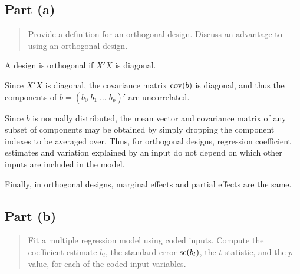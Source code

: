 \documentclass[
]{article}
\begin{document}
\hypertarget{part-a-1}{%
\subsection{Part (a)}\label{part-a-1}}

\begin{quote}
Provide a definition for an orthogonal design. Discuss an advantage to
using an orthogonal design.
\end{quote}

A design is orthogonal if \(X'X\) is diagonal.

Since \(X'X\) is diagonal, the covariance matrix \(\operatorname{cov}(b)\) is
diagonal, and thus the components of
\(b=(b_0 \; b_1 \; \ldots \; b_p)'\) are uncorrelated.

Since \(b\) is normally distributed, the mean vector and covariance
matrix of any subset of components may be obtained by simply dropping
the component indexes to be averaged over. Thus, for orthogonal designs,
regression coefficient estimates and variation explained by an input do
not depend on which other inputs are included in the model.

Finally, in orthogonal designs, marginal effects and partial effects are
the same.

\hypertarget{part-b-1}{%
\subsection{Part (b)}\label{part-b-1}}

\begin{quote}
Fit a multiple regression model using coded inputs. Compute the
coefficient estimate \(b_l\), the standard error \(\operatorname{se}(b_l)\), the
\(t\)-statistic, and the \(p\)-value, for each of the coded input
variables.
\end{quote}
\end{document}
